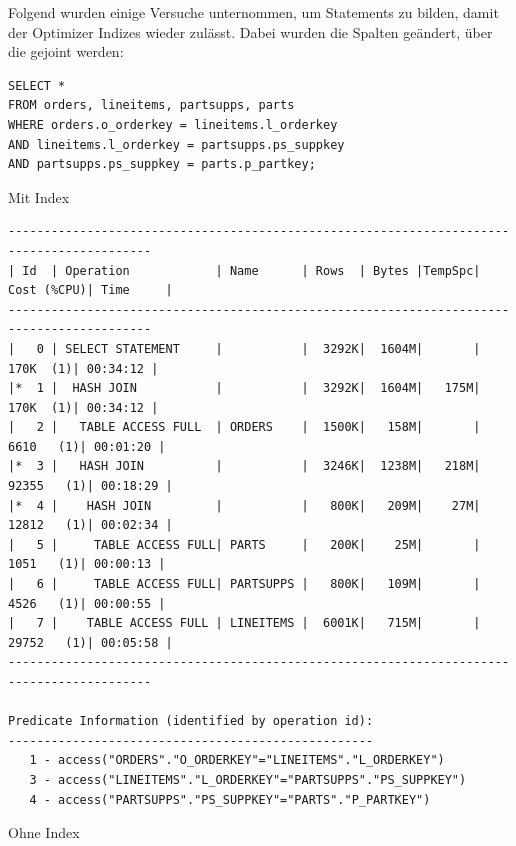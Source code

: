 \documentclass[10pt]{article}
\begin{document}
Folgend wurden einige Versuche unternommen, um Statements zu bilden, damit der Optimizer Indizes wieder zulässt. Dabei wurden die Spalten geändert, über die gejoint werden:
\begin{lstlisting}[style=sql]
SELECT *
FROM orders, lineitems, partsupps, parts
WHERE orders.o_orderkey = lineitems.l_orderkey
AND lineitems.l_orderkey = partsupps.ps_suppkey
AND partsupps.ps_suppkey = parts.p_partkey;
\end{lstlisting}
Mit Index
\begin{lstlisting}[style=queryexecutionplan]
------------------------------------------------------------------------------------------
| Id  | Operation            | Name      | Rows  | Bytes |TempSpc| Cost (%CPU)| Time     |
------------------------------------------------------------------------------------------
|   0 | SELECT STATEMENT     |           |  3292K|  1604M|       |   170K  (1)| 00:34:12 |
|*  1 |  HASH JOIN           |           |  3292K|  1604M|   175M|   170K  (1)| 00:34:12 |
|   2 |   TABLE ACCESS FULL  | ORDERS    |  1500K|   158M|       |  6610   (1)| 00:01:20 |
|*  3 |   HASH JOIN          |           |  3246K|  1238M|   218M| 92355   (1)| 00:18:29 |
|*  4 |    HASH JOIN         |           |   800K|   209M|    27M| 12812   (1)| 00:02:34 |
|   5 |     TABLE ACCESS FULL| PARTS     |   200K|    25M|       |  1051   (1)| 00:00:13 |
|   6 |     TABLE ACCESS FULL| PARTSUPPS |   800K|   109M|       |  4526   (1)| 00:00:55 |
|   7 |    TABLE ACCESS FULL | LINEITEMS |  6001K|   715M|       | 29752   (1)| 00:05:58 |
------------------------------------------------------------------------------------------
 
Predicate Information (identified by operation id):
---------------------------------------------------
   1 - access("ORDERS"."O_ORDERKEY"="LINEITEMS"."L_ORDERKEY")
   3 - access("LINEITEMS"."L_ORDERKEY"="PARTSUPPS"."PS_SUPPKEY")
   4 - access("PARTSUPPS"."PS_SUPPKEY"="PARTS"."P_PARTKEY")
\end{lstlisting}
Ohne Index
\end{document}
